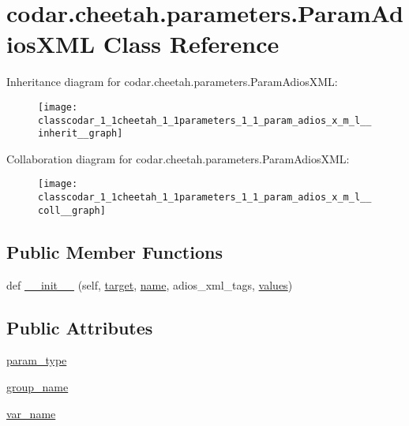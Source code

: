 \hypertarget{classcodar_1_1cheetah_1_1parameters_1_1_param_adios_x_m_l}{}\section{codar.\+cheetah.\+parameters.\+Param\+Adios\+X\+ML Class Reference}
\label{classcodar_1_1cheetah_1_1parameters_1_1_param_adios_x_m_l}


Inheritance diagram for codar.\+cheetah.\+parameters.\+Param\+Adios\+X\+ML\+:
\nopagebreak
\begin{figure}[H]
\begin{center}
\leavevmode
\texttt{[image: classcodar\_1\_1cheetah\_1\_1parameters\_1\_1\_param\_adios\_x\_m\_l\_\_inherit\_\_graph]}
\end{center}
\end{figure}


Collaboration diagram for codar.\+cheetah.\+parameters.\+Param\+Adios\+X\+ML\+:
\nopagebreak
\begin{figure}[H]
\begin{center}
\leavevmode
\texttt{[image: classcodar\_1\_1cheetah\_1\_1parameters\_1\_1\_param\_adios\_x\_m\_l\_\_coll\_\_graph]}
\end{center}
\end{figure}
\subsection*{Public Member Functions}
\begin{DoxyCompactItemize}
\item 
def \hyperlink{classcodar_1_1cheetah_1_1parameters_1_1_param_adios_x_m_l_adf9f325576073f42a6e6258403d2632a}{\+\_\+\+\_\+init\+\_\+\+\_\+} (self, \hyperlink{classcodar_1_1cheetah_1_1parameters_1_1_param_a5603d43a20cfc6447c3718406ce0669e}{target}, \hyperlink{classcodar_1_1cheetah_1_1parameters_1_1_param_ac9982d62cd18a368a3fbc26541e14209}{name}, adios\+\_\+xml\+\_\+tags, \hyperlink{classcodar_1_1cheetah_1_1parameters_1_1_param_aefcc82658f511bddd6605e6ac6e74fbf}{values})
\end{DoxyCompactItemize}
\subsection*{Public Attributes}
\begin{DoxyCompactItemize}
\item 
\hyperlink{classcodar_1_1cheetah_1_1parameters_1_1_param_adios_x_m_l_afde8e863f3fb2178723d8f66d6517da2}{param\+\_\+type}
\item 
\hyperlink{classcodar_1_1cheetah_1_1parameters_1_1_param_adios_x_m_l_a248f6d5289be4cad0d6874ece711189b}{group\+\_\+name}
\item 
\hyperlink{classcodar_1_1cheetah_1_1parameters_1_1_param_adios_x_m_l_a8b796c2d1149b202122fcf13a8d31660}{var\+\_\+name}
\end{DoxyCompactItemize}


